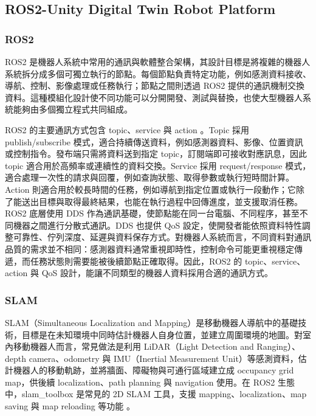 \documentclass[12pt,a4paper]{article}
\begin{document}
\subsection{ROS2-Unity Digital Twin Robot Platform}

\subsubsection{ROS2}

ROS2 是機器人系統中常用的通訊與軟體整合架構，其設計目標是將複雜的機器人系統拆分成多個可獨立執行的節點。每個節點負責特定功能，例如感測資料接收、導航、控制、影像處理或任務執行；節點之間則透過 ROS2 提供的通訊機制交換資料。這種模組化設計使不同功能可以分開開發、測試與替換，也使大型機器人系統能夠由多個獨立程式共同組成。

ROS2 的主要通訊方式包含 topic、service 與 action \cite{ros2_interfaces}。Topic 採用 publish/subscribe 模式，適合持續傳送資料，例如感測器資料、影像、位置資訊或控制指令。發布端只需將資料送到指定 topic，訂閱端即可接收對應訊息，因此 topic 適合用於高頻率或連續性的資料交換。Service 採用 request/response 模式，適合處理一次性的請求與回覆，例如查詢狀態、取得參數或執行短時間計算。Action 則適合用於較長時間的任務，例如導航到指定位置或執行一段動作；它除了能送出目標與取得最終結果，也能在執行過程中回傳進度，並支援取消任務。
ROS2 底層使用 DDS 作為通訊基礎，使節點能在同一台電腦、不同程序，甚至不同機器之間進行分散式通訊。DDS 也提供 QoS 設定，使開發者能依照資料特性調整可靠性、佇列深度、延遲與資料保存方式。對機器人系統而言，不同資料對通訊品質的需求並不相同：感測器資料通常重視即時性，控制命令可能更重視穩定傳遞，而任務狀態則需要能被後續節點正確取得。因此，ROS2 的 topic、service、action 與 QoS 設計，能讓不同類型的機器人資料採用合適的通訊方式。

\subsubsection{SLAM}

SLAM（Simultaneous Localization and Mapping）是移動機器人導航中的基礎技術，目標是在未知環境中同時估計機器人自身位置，並建立周圍環境的地圖。對室內移動機器人而言，常見做法是利用 LiDAR（Light Detection and Ranging）、depth camera、odometry 與 IMU（Inertial Measurement Unit）等感測資料，估計機器人的移動軌跡，並將牆面、障礙物與可通行區域建立成 occupancy grid map，供後續 localization、path planning 與 navigation 使用。在 ROS2 生態中，slam\_toolbox 是常見的 2D SLAM 工具，支援 mapping、localization、map saving 與 map reloading 等功能 \cite{slam_toolbox}。
\end{document}
